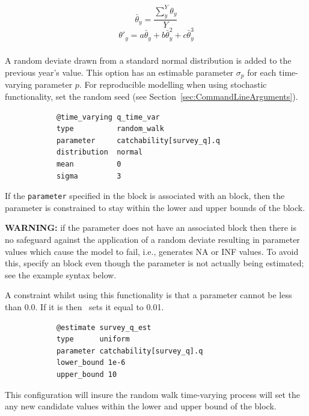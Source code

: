 \begin{equation}
	\bar{\theta}_y = \frac{\sum_{y}^Y\theta_y}{Y}
\end{equation}
\begin{equation}
	\theta'_y = a \bar{\theta}_y + b\bar{\theta}_y^{2} + c\bar{\theta}_y^{3}
\end{equation}

\subsubsection[Random Walk]{}\label{sec:TimeVarying-RandomWalk}

A random deviate drawn from a standard normal distribution is added to the previous year's value. This option has an estimable parameter $\sigma_p$ for each time-varying parameter $p$. For reproducible modelling when using stochastic functionality, set the random seed (see Section~\ref{sec:CommandLineArguments}).

{\small{\begin{verbatim}
			@time_varying q_time_var
			type          random_walk
			parameter     catchability[survey_q].q
			distribution  normal
			mean          0
			sigma         3
\end{verbatim}}}

If the \texttt{parameter} specified in the  block is associated with an  block, then the parameter is constrained to stay within the lower and upper bounds of the  block.

\textbf{WARNING:} if the parameter does not have an associated  block then there is no safeguard against the application of a random deviate resulting in parameter values which cause the model to fail, i.e., generates NA or INF values. To avoid this, specify an  block even though the parameter is not actually being estimated; see the example syntax below.

A constraint whilst using this functionality is that a parameter cannot be less than 0.0. If it is then \CNAME\ sets it equal to 0.01.

{\small{\begin{verbatim}
			@estimate survey_q_est
			type      uniform
			parameter catchability[survey_q].q
			lower_bound 1e-6
			upper_bound 10
\end{verbatim}}}

This configuration will insure the random walk time-varying process will set the any new candidate values within the lower and upper bound of the  block.

